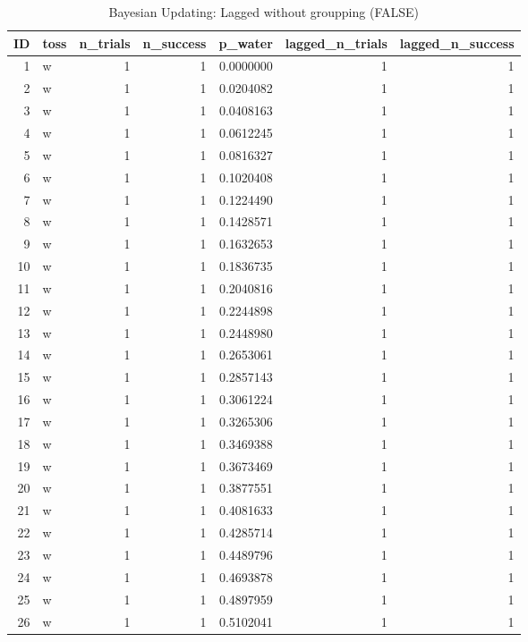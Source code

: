 \documentclass[
  letterpaper,
  DIV=11,
  numbers=noendperiod]{scrreprt}
\begin{document}
\hypertarget{tbl-bayesian-model-learning-anno2-2}{}
\begin{table}
\caption{\label{tbl-bayesian-model-learning-anno2-2}Bayesian Updating: Lagged without groupping (FALSE) }\tabularnewline

\centering
\begin{tabular}[t]{r|l|r|r|r|r|r}
\hline
ID & toss & n\_trials & n\_success & p\_water & lagged\_n\_trials & lagged\_n\_success\\
\hline
1 & w & 1 & 1 & 0.0000000 & 1 & 1\\
\hline
2 & w & 1 & 1 & 0.0204082 & 1 & 1\\
\hline
3 & w & 1 & 1 & 0.0408163 & 1 & 1\\
\hline
4 & w & 1 & 1 & 0.0612245 & 1 & 1\\
\hline
5 & w & 1 & 1 & 0.0816327 & 1 & 1\\
\hline
6 & w & 1 & 1 & 0.1020408 & 1 & 1\\
\hline
7 & w & 1 & 1 & 0.1224490 & 1 & 1\\
\hline
8 & w & 1 & 1 & 0.1428571 & 1 & 1\\
\hline
9 & w & 1 & 1 & 0.1632653 & 1 & 1\\
\hline
10 & w & 1 & 1 & 0.1836735 & 1 & 1\\
\hline
11 & w & 1 & 1 & 0.2040816 & 1 & 1\\
\hline
12 & w & 1 & 1 & 0.2244898 & 1 & 1\\
\hline
13 & w & 1 & 1 & 0.2448980 & 1 & 1\\
\hline
14 & w & 1 & 1 & 0.2653061 & 1 & 1\\
\hline
15 & w & 1 & 1 & 0.2857143 & 1 & 1\\
\hline
16 & w & 1 & 1 & 0.3061224 & 1 & 1\\
\hline
17 & w & 1 & 1 & 0.3265306 & 1 & 1\\
\hline
18 & w & 1 & 1 & 0.3469388 & 1 & 1\\
\hline
19 & w & 1 & 1 & 0.3673469 & 1 & 1\\
\hline
20 & w & 1 & 1 & 0.3877551 & 1 & 1\\
\hline
21 & w & 1 & 1 & 0.4081633 & 1 & 1\\
\hline
22 & w & 1 & 1 & 0.4285714 & 1 & 1\\
\hline
23 & w & 1 & 1 & 0.4489796 & 1 & 1\\
\hline
24 & w & 1 & 1 & 0.4693878 & 1 & 1\\
\hline
25 & w & 1 & 1 & 0.4897959 & 1 & 1\\
\hline
26 & w & 1 & 1 & 0.5102041 & 1 & 1\\

\end{tabular}
\end{table}
\end{document}
